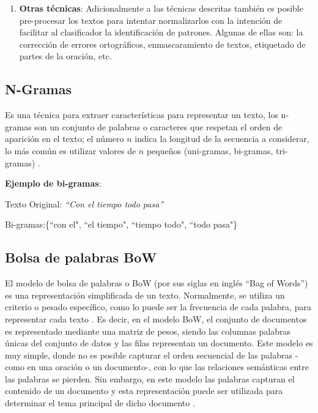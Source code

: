 \begin{enumerate}
\item  \textbf{Otras técnicas}: Adicionalmente a  las técnicas descritas también es posible pre-procesar los textos para intentar normalizarlos con la intención de facilitar al clasificador la identificación de patrones. Algunas de ellas son: la corrección de errores ortográficos, enmascaramiento de textos, etiquetado de partes de la oración, etc.

\end{enumerate}


\subsection{N-Gramas}
Es una técnica para extraer características para representar un texto, los n-gramas son un conjunto de palabras o caracteres que respetan el orden de aparición en el texto; el número $n$ indica la longitud de la secuencia a considerar, lo más común es utilizar valores de $n$ pequeños (uni-gramas, bi-gramas, tri-gramas) \citep{kowsari2019text}. 

\textbf{Ejemplo de bi-gramas}: 

Texto Original: \textit{``Con el tiempo todo pasa''}

Bi-gramas:\{``con el", ``el tiempo", ``tiempo todo", ``todo pasa"\}


\subsection{Bolsa de palabras BoW}
El modelo de bolsa de palabras o BoW (por sus siglas en inglés ``Bag of Words'') es una representación simplificada de un texto. Normalmente, se utiliza un criterio o pesado específico, como lo puede ser la frecuencia de cada palabra, para representar cada texto . Es decir, en el modelo BoW, el conjunto de documentos es representado mediante una matriz de pesos, siendo las columnas palabras únicas del conjunto de datos y las filas representan un documento. Este modelo es muy simple, donde no es posible capturar el orden secuencial de las palabras -como en una oración o un documento-, con lo que las relaciones semánticas entre las palabras se pierden. Sin embargo, en este modelo las palabras capturan el contenido de un documento y esta representación puede ser utilizada para determinar el tema principal de dicho documento \citep{kowsari2019text}.




